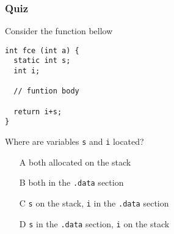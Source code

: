 \documentclass{beamer}
\begin{document}
\begin{frame}[fragile]
\frametitle{Quiz}

Consider the function bellow
\begin{verbatim}
int fce (int a) {
  static int s;
  int i;
  
  // funtion body
  
  return i+s;
}
\end{verbatim}
Where are variables \texttt{s} and \texttt{i} located?
\begin{itemize}
 \item[A] both allocated on the stack
 \item[B] both in the \texttt{.data} section
 \item[C] \texttt{s} on the stack, \texttt{i} in the \texttt{.data} section
 \item[D] \texttt{s} in the \texttt{.data} section, \texttt{i} on the stack
\end{itemize}
\end{frame}
\end{document}
